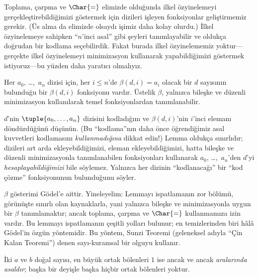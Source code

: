 



Toplama, çarpma ve $\Char{=}$ elimizde olduğunda ilkel özyinelemeyi
gerçekleştirebildiğimizi göstermek için dizileri işleyen fonksiyonlar
geliştirmemiz gerekir. (Üs alma da elimizde olsaydı işimiz daha kolay
olurdu.) İlkel özyinelemeye sahipken ``$n$'inci asal'' gibi şeyleri
tanımlayabilir ve oldukça doğrudan bir kodlama seçebilirdik. Fakat burada
ilkel özyinelememiz yoktur---gerçekte ilkel özyinelemeyi minimizasyon
kullanarak yapabildiğimizi göstermek istiyoruz---bu yüzden daha yaratıcı
olmalıyız.

\begin{lem}
Her $a_0$, \dots,~$a_n$ dizisi için, her $i\le n$'de
$\beta(d,i)=a_i$ olacak bir $d$ sayısının bulunduğu bir $\beta(d,i)$
fonksiyonu vardır. Üstelik $\beta$, yalnızca bileşke ve düzenli minimizasyon
kullanılarak temel fonksiyonlardan tanımlanabilir.
\end{lem}

$d$'nin $\tuple{a_0,\dots,a_n}$ dizisini kodladığını ve $\beta(d,i)$'nin
$i$'inci elemanı döndürdüğünü düşünün. (Bu ``kodlama''nın daha önce
öğrendiğimiz asal kuvvetleri kodlamasını \emph{kullanmadığına} dikkat edin!)
Lemma oldukça sınırlıdır; dizileri art arda ekleyebildiğimizi, eleman
ekleyebildiğimizi, hatta bileşke ve düzenli minimizasyonla tanımlanabilen
fonksiyonları kullanarak $a_0$, \dots,~$a_n$'den $d$'yi
\emph{hesaplayabildiğimizi} bile söylemez. Yalnızca her dizinin
``kodlanacağı'' bir ``kod çözme'' fonksiyonunun bulunduğunu söyler.

$\beta$ gösterimi G\"odel'e aittir. Yineleyelim: Lemmayı ispatlamanın zor
bölümü, görünüşte sınırlı olan kaynaklarla, yani yalnızca bileşke ve
minimizasyonla uygun bir $\beta$ tanımlamaktır; ancak toplama, çarpma ve
$\Char{=}$ kullanmamıza izin vardır. Bu lemmayı ispatlamanın çeşitli yolları
bulunur; en temizlerinden biri hâlâ G\"odel'in özgün yöntemidir. Bu yöntem,
Sunzi Teoremi (geleneksel adıyla ``Çin Kalan Teoremi'') denen sayı-kuramsal
bir olguyu kullanır.

\begin{defn}
İki $a$ ve $b$ doğal sayısı, en büyük ortak bölenleri $1$ ise ancak ve ancak
\emph{aralarında asaldır}; başka bir deyişle başka hiçbir ortak bölenleri
yoktur.
\end{defn}

